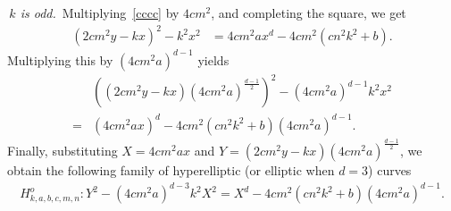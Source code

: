 \documentclass[11pt,a4paper]{amsart}
\theoremstyle{plain}
\theoremstyle{definition}
\begin{document}
 \,\textit{$k$ is odd.}\, 
Multiplying~\eqref{cccc} by $4cm^2$, and completing the square, we get
\begin{align*}
    (2cm^2y - kx)^2 - k^2x^2 &= 4cm^2ax^d - 4cm^2(cn^2k^2 + b).
\end{align*}
Multiplying this by $(4cm^2a)^{d-1}$ yields
\begin{align*}
    &\left((2cm^2y - kx)(4cm^2a)^{\frac{d-1}{2}}\right)^2 - (4cm^2a)^{d-1}k^2x^2 \\
    =& (4cm^2ax)^d - 4cm^2(cn^2k^2 + b)(4cm^2a)^{d-1}.
\end{align*}
 Finally, substituting $X = 4cm^2ax$ and $Y = (2cm^2y - kx)(4cm^2a)^{\frac{d-1}{2}}$, we obtain the following family of hyperelliptic (or elliptic when $d=3$) curves
\begin{align}\label{Hyperelliptic odd}
    H_{k,a,b,c,m,n}^o : Y^2 - (4cm^2a)^{d-3}k^2X^2 = X^d - 4cm^2(cn^2k^2 + b)(4cm^2a)^{d-1}.
\end{align}
\end{document}
